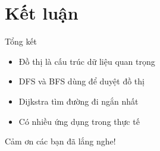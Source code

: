 \documentclass[aspectratio=169]{beamer}
\begin{document}

\section{Kết luận}

\begin{frame}{Tổng kết}

\begin{itemize}

\item Đồ thị là cấu trúc dữ liệu quan trọng

\item DFS và BFS dùng để duyệt đồ thị

\item Dijkstra tìm đường đi ngắn nhất

\item Có nhiều ứng dụng trong thực tế

\end{itemize}

\end{frame}

\begin{frame}

\centering
\Huge
Cảm ơn các bạn đã lắng nghe!

\end{frame}
\end{document}
